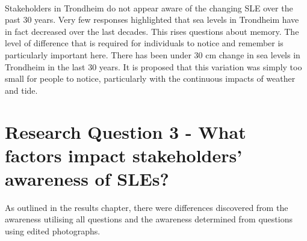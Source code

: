 \paragraph{}
Stakeholders in Trondheim do not appear aware of the changing SLE over the past 30 years. Very few responses highlighted that sea levels in Trondheim have in fact decreased over the last decades. This rises questions about memory. The level of difference that is required for individuals to notice and remember is particularly important here. There has been under 30 cm change in sea levels in Trondheim in the last 30 years. It is proposed that this variation was simply too small for people to notice, particularly with the continuous impacts of weather and tide. 
\paragraph{}

\section{Research Question 3 - What factors impact stakeholders' awareness of SLEs? } \label{RQ3 - finding}
 As outlined in the results chapter, there were differences discovered from the awareness utilising all questions and the awareness determined from questions using edited photographs. 
\paragraph{}

